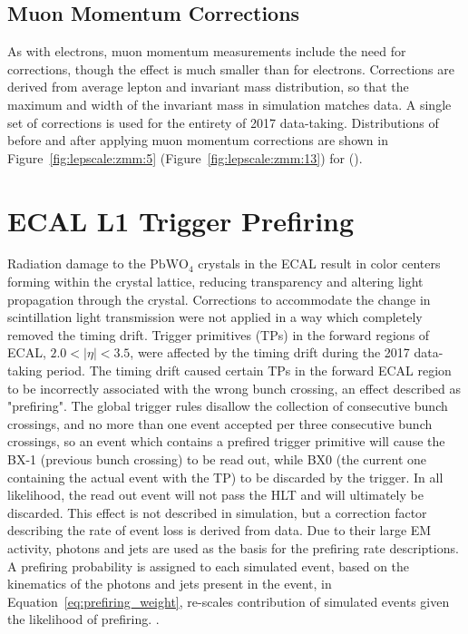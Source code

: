 



\subsection{Muon Momentum Corrections}
As with electrons, muon momentum measurements include the need for corrections, though the effect is much smaller than for electrons. Corrections are derived from average lepton \pt and \zmm invariant mass distribution, so that the maximum and width of the \zmm invariant mass in simulation matches data\cite{Bodek:2012id}.  A single set of corrections is used for the entirety of 2017 data-taking. Distributions of \zmm \mll before and after applying muon momentum corrections are shown in Figure~\ref{fig:lepscale:zmm:5} (Figure~\ref{fig:lepscale:zmm:13}) for \sg (\sh).






\section{ECAL L1 Trigger Prefiring}\label{ch:prefire}

Radiation damage to the $\mathrm{PbWO_4}$ crystals in the ECAL result in color centers forming within the crystal lattice, reducing transparency and altering light propagation through the crystal. Corrections to accommodate the change in scintillation light transmission were not applied in a way which completely removed the timing drift. Trigger primitives (TPs) in the forward regions of ECAL, $2.0 < |\eta| < 3.5$, were affected by the timing drift during the 2017 data-taking period. The timing drift caused certain TPs in the forward ECAL region to be incorrectly associated with the wrong bunch crossing, an effect described as "prefiring". The global trigger rules disallow the collection of consecutive bunch crossings, and no more than one event accepted per three consecutive bunch crossings, so an event which contains a prefired trigger primitive will cause the BX-1 (previous bunch crossing) to be read out, while BX0 (the current one containing the actual event with the TP) to be discarded by the trigger. In all likelihood, the read out event will not pass the HLT and will ultimately be discarded.
This effect is not described in simulation, but a correction factor describing the rate of event loss is derived from data. Due to their large EM activity, photons and jets are used as the basis for the prefiring rate descriptions. A prefiring probability is assigned to each simulated event, based on the kinematics of the photons and jets present in the event, in Equation~\ref{eq:prefiring_weight}, re-scales contribution of simulated events given the likelihood of prefiring.
.

